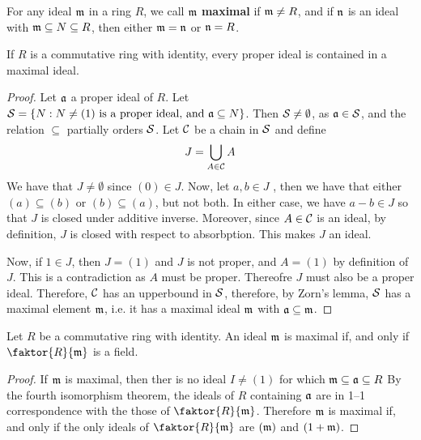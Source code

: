 \begin{definition}
    For any ideal $\mathfrak{m}$ in a ring $R$, we call $\mathfrak{m}$  \textbf{maximal}
    if $\mathfrak{m} \neq R$, and if  $\mathfrak{n}$ is an ideal with  $\mathfrak{m} \subseteq N \subseteq
    R$, then either  $\mathfrak{m}=\mathfrak{n}$ or $\mathfrak{n}=R$.
\end{definition}

\begin{lemma}\label{1.4.2}
    If $R$ is a commutative ring with identity, every proper ideal is contained
    in a maximal ideal.
\end{lemma}
\begin{proof}
    Let $\mathfrak{a}$ a proper ideal of $R$. Let $\mathcal{S}=\{N : N \neq (1) \text{ is a proper
    ideal, and } \mathfrak{a} \subseteq N\}$. Then $\mathcal{S} \neq \emptyset$, as  $\mathfrak{a} \in \mathcal{S}$,
    and the relation $\subseteq$ partially orders $\mathcal{S}$. Let  $\mathcal{C}$ be a chain
    in $\mathcal{S}$ and define
    \begin{equation*}
        J=\bigcup_{A \in \mathcal{C}}{A}
    \end{equation*}
    We have that $J \neq \emptyset$ since  $(0) \in J$. Now, let $a,b \in J$ ,
    then we have that either  $(a) \subseteq (b)$ or $(b) \subseteq (a)$, but
    not both. In either case, we have $a-b \in J$ so that  $J$ is closed under
    additive inverse. Moreover, since  $A \in \mathcal{C}$ is an ideal, by definition,
    $J$ is closed with respect to absorbption. This makes  $J$ an ideal.

    Now, if  $1 \in J$, then $J=(1)$ and $J$ is not proper, and $A=(1)$ by
    definition of $J$. This is a contradiction as $A$ must be proper. Thereofre
    $J$ must also be a proper ideal. Therefore,  $\mathcal{C}$ has an upperbound in
    $\mathcal{S}$, therefore, by Zorn's lemma,  $\mathcal{S}$ has a maximal element $\mathfrak{m}$, i.e.
    it has a maximal ideal $\mathfrak{m}$ with  $\mathfrak{a} \subseteq \mathfrak{m}$.
\end{proof}

\begin{lemma}\label{1.4.3}
    Let $R$ be a commutative ring with identity. An ideal $\mathfrak{m}$ is maximal if,
    and only if  $\faktor{R}{\mf}$ is a field.
\end{lemma}
\begin{proof}
    If $\mathfrak{m}$ is maximal, then ther is no ideal $I \neq (1)$ for which $\mathfrak{m}
    \subseteq \mathfrak{a} \subseteq R$ By the fourth isomorphism theorem, the ideals of
    $R$ containing  $\mathfrak{a}$ are in 1--1 correspondence with the those of
    $\faktor{R}{\mf}$. Therefore $\mathfrak{m}$ is maximal if, and only if the only
    ideals of $\faktor{R}{\mf}$ are $(\mathfrak{m})$ and $(1+\mathfrak{m})$.
\end{proof}


